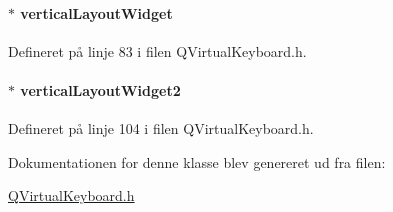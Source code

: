 \paragraph[{\texorpdfstring{vertical\+Layout\+Widget}{verticalLayoutWidget}}]{$\ast$ vertical\+Layout\+Widget\hspace{0.3cm}{\ttfamily [private]}}\hypertarget{class_q_virtual_keyboard_a4dab2ee47678bbea22fe10267a009293}{}\label{class_q_virtual_keyboard_a4dab2ee47678bbea22fe10267a009293}


Defineret på linje 83 i filen Q\+Virtual\+Keyboard.\+h.

\paragraph[{\texorpdfstring{vertical\+Layout\+Widget2}{verticalLayoutWidget2}}]{$\ast$ vertical\+Layout\+Widget2\hspace{0.3cm}{\ttfamily [private]}}\hypertarget{class_q_virtual_keyboard_a6cae2ca1d83910c66adfc69bc57a770d}{}\label{class_q_virtual_keyboard_a6cae2ca1d83910c66adfc69bc57a770d}


Defineret på linje 104 i filen Q\+Virtual\+Keyboard.\+h.



Dokumentationen for denne klasse blev genereret ud fra filen\+:\begin{DoxyCompactItemize}
\item 
\hyperlink{_q_virtual_keyboard_8h}{Q\+Virtual\+Keyboard.\+h}\end{DoxyCompactItemize}

